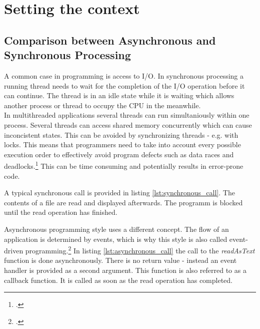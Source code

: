 \section{Setting the context}
\label{setting_the_context}

\subsection{Comparison between Asynchronous and Synchronous Processing}
\label{comparison}

A common case in programming is access to I/O.
In synchronous processing a running thread needs to wait for the completion of
the I/O operation before it can continue.
The thread is in an idle state while it is waiting which allows another process 
or thread to occupy the CPU in the meanwhile.\\

In multithreaded applications several threads can run simultaniously within one 
process. Several threads can access shared memory concurrently which can
cause inconcistent states. This can be avoided by synchronizing threads - e.g.
with locks. This means that programmers need to take into account every possible
execution order to effectively avoid program defects such as data races and 
deadlocks.\footcite[Cf.][10]{Breshears_2009}
This can be time consuming and potentially results in error-prone code.

A typical synchronous call is provided in listing \ref{lst:synchronous_call}. The
contents of a file are read and displayed afterwards. The programm is blocked until the
read operation has finished.




Asynchronous programming style uses a different concept. The flow of an
application is determined by events, which is why this style is also called
event-driven programming.\footcite[Cf.][TODO]{teixeira_2012} In listing \ref{lst:asynchronous_call} the call
to the \textit{readAsText} function is done asynchronously. There is no
return value - instead an event handler is provided as a second argument.
This function is also referred to as a callback function. It is called
as soon as the read operation has completed.

